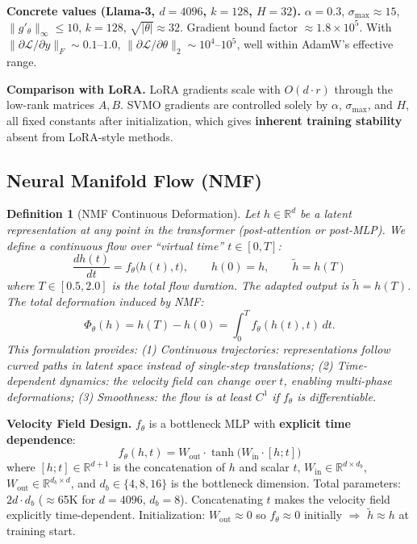 \documentclass[conference]{IEEEtran}
\newtheorem{definition}[theorem]{Definition}
\newcommand{\nmf}{\textsc{NMF}}
\newcommand{\RR}{\mathbb{R}}
\begin{document}
\textbf{Concrete values (Llama-3, $d{=}4096$, $k{=}128$, $H{=}32$).}
$\alpha = 0.3$, $\sigma_{\max} \approx 15$, $\|g'_\theta\|_\infty \leq 10$, $k{=}128$, $\sqrt{|\theta|} \approx 32$. Gradient bound factor $\approx 1.8\times 10^5$. With $\|\partial\mathcal{L}/\partial y\|_F \sim 0.1$--$1.0$, $\|\partial\mathcal{L}/\partial\theta\|_2 \sim 10^4$--$10^5$, well within AdamW's effective range.

\textbf{Comparison with LoRA.} LoRA gradients scale with $O(d \cdot r)$ through the low-rank matrices $A,B$. SVMO gradients are controlled solely by $\alpha$, $\sigma_{\max}$, and $H$, all fixed constants after initialization, which gives \textbf{inherent training stability} absent from LoRA-style methods.

\subsection{Neural Manifold Flow (\nmf)}

\begin{definition}[\nmf{} Continuous Deformation]
Let $h \in \RR^d$ be a latent representation at any point in the transformer (post-attention or post-MLP). We define a continuous flow over ``virtual time'' $t \in [0,T]$:
\begin{equation}
\frac{dh(t)}{dt} = f_\theta\big(h(t), t\big), \qquad h(0) = h, \qquad \tilde{h} = h(T)
\end{equation}
where $T \in [0.5, 2.0]$ is the total flow duration. The adapted output is $\tilde{h} = h(T)$. The total deformation induced by NMF:
\begin{equation}
\Phi_\theta(h) = h(T) - h(0) = \int_0^T f_\theta(h(t), t)\,dt.
\end{equation}
This formulation provides: (1) \textit{Continuous trajectories}: representations follow curved paths in latent space instead of single-step translations; (2) \textit{Time-dependent dynamics}: the velocity field can change over $t$, enabling multi-phase deformations; (3) \textit{Smoothness}: the flow is at least $C^1$ if $f_\theta$ is differentiable.
\end{definition}

\textbf{Velocity Field Design.} $f_\theta$ is a bottleneck MLP with \textbf{explicit time dependence}:
\begin{equation}
f_\theta(h, t) = W_{\text{out}} \cdot \tanh\!\big(W_{\text{in}} \cdot [h; t]\big)
\end{equation}
where $[h; t] \in \RR^{d+1}$ is the concatenation of $h$ and scalar $t$, $W_{\text{in}} \in \RR^{d \times d_b}$, $W_{\text{out}} \in \RR^{d_b \times d}$, and $d_b \in \{4, 8, 16\}$ is the bottleneck dimension. Total parameters: $2d \cdot d_b$ ($\approx$65K for $d=4096$, $d_b=8$). Concatenating $t$ makes the velocity field explicitly time-dependent. Initialization: $W_{\text{out}} \approx 0$ so $f_\theta \approx 0$ initially $\Rightarrow$ $\tilde{h} \approx h$ at training start.
\end{document}
